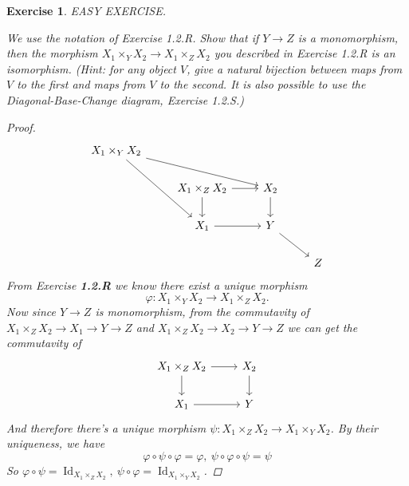 \documentclass{article}
\theoremstyle{breakstyle}
\newtheorem{exercise}{Exercise}[section]
\DeclareMathOperator{\id}{Id}
\begin{document}
\begin{exercise}
EASY EXERCISE.

We use the notation of Exercise 1.2.R. Show that if $Y \rightarrow Z$ is a
monomorphism, then the morphism $X_{1} \times_{Y} X_{2} \rightarrow X_{1}
\times_{Z} X_{2}$ you described in Exercise 1.2.R is an isomorphism. (Hint:
for any object $V$, give a natural bijection between maps from $V$ to the
first and maps from $V$ to the second. It is also possible to use the
Diagonal-Base-Change diagram, Exercise 1.2.S.)

\begin{proof}
	$$
	\begin{tikzcd}
        X_1\times_YX_2 \arrow[rdd] \arrow[rrd] &                                    &               &   \\
                                               & X_1\times_ZX_2 \arrow[d] \arrow[r] & X_2 \arrow[d] &   \\
                                               & X_1 \arrow[r]                      & Y \arrow[rd]  &   \\
                                               &                                    &               & Z
	\end{tikzcd}
	$$ 
	From Exercise \textbf{1.2.R} we know there exist a unique morphism
	$$
	\varphi:X_1\times_{Y}X_2\longrightarrow X_1\times _{Z}X_2
	.$$ 
    Now since $Y\longrightarrow Z$ is monomorphism, from the commutavity of
    $X_1\times _{Z}X_2\rightarrow X_1\rightarrow Y\rightarrow Z$ and $X_1\times
    _{Z}X_2\rightarrow X_2\rightarrow Y\rightarrow Z$ we can get the commutavity
    of
	$$
	\begin{tikzcd}
X_1\times_ZX_2 \arrow[d] \arrow[r] & X_2 \arrow[d] \\
X_1 \arrow[r]                      & Y            
	\end{tikzcd}
	$$ 
    And therefore there's a unique morphism $\psi:X_1\times
    _{Z}X_2\longrightarrow X_1\times _{Y}X_2$. By their uniqueness, we have
	$$
	\varphi\circ \psi\circ \varphi=\varphi,\ \psi\circ \varphi\circ \psi=\psi
	$$ 
    So $\varphi\circ \psi=\id_{X_1\times _{Z}X_2},\ \psi\circ
    \varphi=\id_{X_1\times _{Y}X_2}$.
\end{proof}

\end{exercise}
\end{document}
